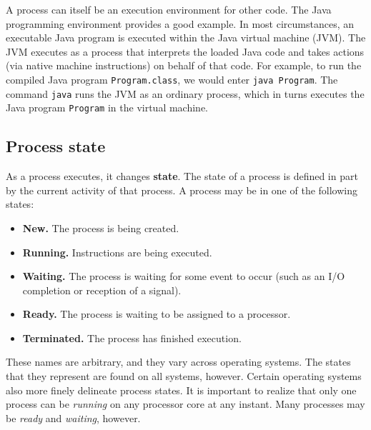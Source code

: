 A process can itself be an execution environment for other code. The Java programming environment provides a good example. In most circumstances, an executable Java program is executed within the Java virtual machine (JVM). The JVM executes as a process that interprets the loaded Java code and takes actions (via native machine instructions) on behalf of that code. For example, to run the compiled Java program \texttt{Program.class}, we would enter \texttt{java Program}. The command \texttt{java} runs the JVM as an ordinary process, which in turns executes the Java program \texttt{Program} in the virtual machine.

\subsection*{Process state}
As a process executes, it changes \textbf{state}. The state of a process is defined in part by the current activity of that process. A process may be in one of the following states:
\begin{itemize}
    \item \textbf{New.} The process is being created.
    \item \textbf{Running.} Instructions are being executed.
    \item \textbf{Waiting.} The process is waiting for some event to occur (such as an I/O completion or reception of a signal).
    \item \textbf{Ready.} The process is waiting to be assigned to a processor.
    \item \textbf{Terminated.} The process has finished execution.
\end{itemize}
These names are arbitrary, and they vary across operating systems. The states that they represent are found on all systems, however. Certain operating systems also more finely delineate process states. It is important to realize that only one process can be \textit{running} on any processor core at any instant. Many processes may be \textit{ready} and \textit{waiting}, however.

